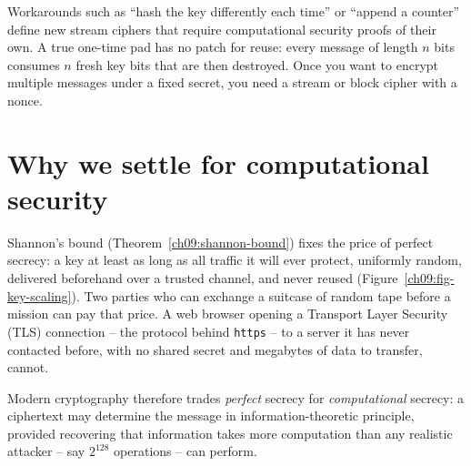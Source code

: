 \begin{trapbox}
Workarounds such as ``hash the key differently each time'' or ``append a counter'' define new stream ciphers that require computational security proofs of their own. A true one-time pad has no patch for reuse: every message of length $n$ bits consumes $n$ fresh key bits that are then destroyed. Once you want to encrypt multiple messages under a fixed secret, you need a stream or block cipher with a nonce.
\end{trapbox}

\section{Why we settle for computational security}
\label{ch09:computational}

Shannon's bound (Theorem~\ref{ch09:shannon-bound}) fixes the price of perfect secrecy: a key at least as long as all traffic it will ever protect, uniformly random, delivered beforehand over a trusted channel, and never reused (Figure~\ref{ch09:fig-key-scaling}). Two parties who can exchange a suitcase of random tape before a mission can pay that price. A web browser opening a Transport Layer Security (TLS) connection -- the protocol behind \texttt{https} -- to a server it has never contacted before, with no shared secret and megabytes of data to transfer, cannot.

Modern cryptography therefore trades \emph{perfect} secrecy for \emph{computational} secrecy: a ciphertext may determine the message in information-theoretic principle, provided recovering that information takes more computation than any realistic attacker -- say $2^{128}$ operations -- can perform.

